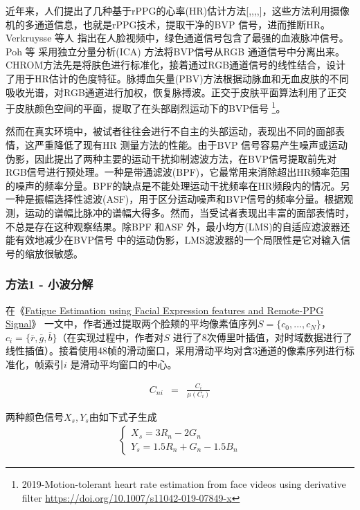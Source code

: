 近年来，人们提出了几种基于rPPG的心率(HR)估计方法[\cite{6523142},\cite{de2014improved},\cite{poh2010non},\cite{verkruysse2008remote},\cite{wang2016algorithmic}]，这些方法利用摄像机的多通道信息，也就是rPPG技术，提取干净的BVP 信号，进而推断HR。Verkruysse 等人\cite{verkruysse2008remote} 指出在人脸视频中，绿色通道信号包含了最强的血液脉冲信号。Poh 等\cite{poh2010non} 采用独立分量分析(ICA) 方法将BVP信号从RGB 通道信号中分离出来。CHROM\cite{6523142}方法先是将肤色进行标准化，接着通过RGB通道信号的线性结合，设计了用于HR估计的色度特征。脉搏血矢量(PBV)方法\cite{de2014improved}根据动脉血和无血皮肤的不同吸收光谱，对RGB通道进行加权，恢复脉搏波。正交于皮肤平面\cite{wang2016algorithmic}算法利用了正交于皮肤颜色空间的平面，提取了在头部剧烈运动下的BVP信号
\footnote{2019-Motion-tolerant heart rate estimation from face videos using derivative filter \quad \url{https://doi.org/10.1007/s11042-019-07849-x}}。

然而在真实环境中，被试者往往会进行不自主的头部运动，表现出不同的面部表情，这严重降低了现有HR 测量方法的性能。由于BVP 信号容易产生噪声或运动伪影，因此提出了两种主要的运动干扰抑制滤波方法，在BVP信号提取前先对RGB信号进行预处理。一种是带通滤波(BPF)，它最常用来消除超出HR频率范围的噪声的频率分量。BPF的缺点是不能处理运动干扰频率在HR频段内的情况。另一种是振幅选择性滤波(ASF)\cite{wang2017amplitude}，用于区分运动噪声和BVP信号的频率分量。根据观测，运动的谱幅比脉冲的谱幅大得多。然而，当受试者表现出丰富的面部表情时，不总是存在这种观察结果。除BPF 和ASF 外，最小均方(LMS)的自适应滤波器还能有效地减少在BVP信号\cite{liu2018self} 中的运动伪影，LMS滤波器的一个局限性是它对输入信号的缩放很敏感。

\subsubsection{方法1 - 小波分解}

在《\href{https://ieeexplore.ieee.org/abstract/document/8956411}{Fatigue Estimation using Facial Expression features and Remote-PPG Signal}》 一文中，作者通过提取两个脸颊的平均像素值序列$S = \{c_0, . . . , c_N \}$，$c_i = \{\overline{r}, \overline{g}, \overline{b}\}$（在实现过程中，作者对$S$ 进行了8次傅里叶插值，对时域数据进行了线性插值）。接着使用48帧的滑动窗口，采用滑动平均对含3通道的像素序列进行标准化，帧索引$i$ 是滑动平均窗口的中心。

\begin{eqnarray}
C_{ni} & = & \frac{C_i}{\mu(C_i)}
\end{eqnarray}

两种颜色信号$X_s,Y_s$由如下式子生成
\begin{align}
\begin{cases}
X_s = 3R_n - 2G_n \\
Y_s = 1.5R_n + G_n - 1.5B_n
\end{cases}
\end{align}

